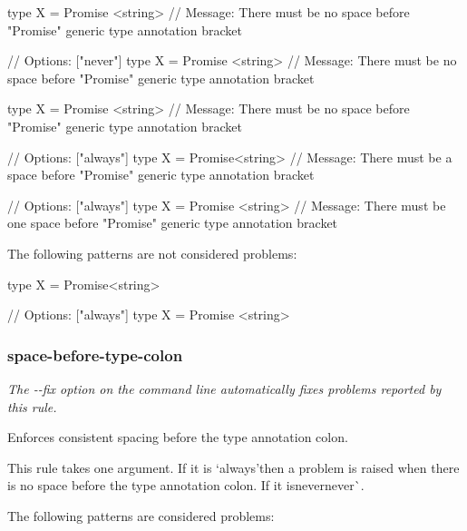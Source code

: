 \begin{DoxyCode}
type X = Promise <string>
// Message: There must be no space before "Promise" generic type annotation bracket

// Options: ["never"]
type X = Promise <string>
// Message: There must be no space before "Promise" generic type annotation bracket

type X = Promise  <string>
// Message: There must be no space before "Promise" generic type annotation bracket

// Options: ["always"]
type X = Promise<string>
// Message: There must be a space before "Promise" generic type annotation bracket

// Options: ["always"]
type X = Promise  <string>
// Message: There must be one space before "Promise" generic type annotation bracket
\end{DoxyCode}


The following patterns are not considered problems\+:


\begin{DoxyCode}
type X = Promise<string>

// Options: ["always"]
type X = Promise <string>
\end{DoxyCode}


\label{_eslint-plugin-flowtype-rules-space-before-type-colon}%
 \subsubsection*{{\ttfamily space-\/before-\/type-\/colon}}

{\itshape The {\ttfamily -\/-\/fix} option on the command line automatically fixes problems reported by this rule.}

Enforces consistent spacing before the type annotation colon.

This rule takes one argument. If it is `\textquotesingle{}always'{\ttfamily then a problem is raised when there is no space before the type annotation colon. If it is}\textquotesingle{}never\textquotesingle{}never\textquotesingle{}\`{}.

The following patterns are considered problems\+:


